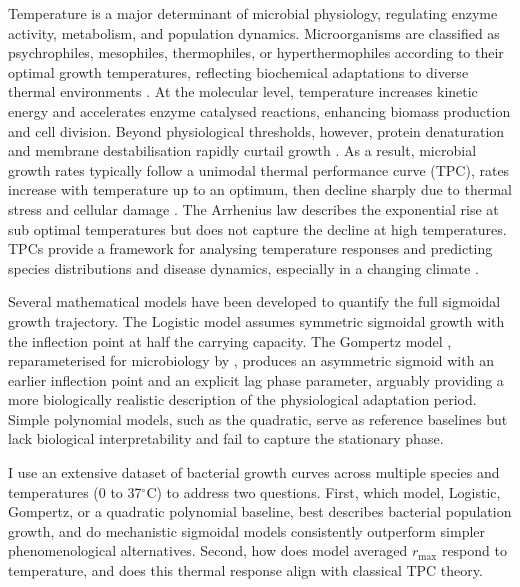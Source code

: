 \documentclass[11pt,a4paper]{article}
\begin{document}
Temperature is a major determinant of microbial physiology, regulating
enzyme activity, metabolism, and population dynamics. Microorganisms are
classified as psychrophiles, mesophiles, thermophiles, or
hyperthermophiles according to their optimal growth temperatures,
reflecting biochemical adaptations to diverse thermal environments
\citep{Arpino2024}. At the molecular level, temperature increases kinetic
energy and accelerates enzyme catalysed reactions, enhancing biomass
production and cell division. Beyond physiological thresholds, however,
protein denaturation and membrane destabilisation rapidly curtail growth
\citep{Gaba2024}. As a result, microbial growth rates typically follow
a unimodal thermal performance curve (TPC), rates increase with
temperature up to an optimum, then decline sharply due to thermal stress
and cellular damage \citep{Pawar2021}. The Arrhenius law describes the
exponential rise at sub optimal temperatures but does not capture the
decline at high temperatures. TPCs provide a framework for analysing
temperature responses and predicting species distributions and disease
dynamics, especially in a changing climate \citep{Smith2024}.

Several mathematical models have been developed to quantify the full
sigmoidal growth trajectory. The Logistic model \citep{Verhulst1838}
assumes symmetric sigmoidal growth with the inflection point at half the
carrying capacity. The Gompertz model \citep{Gompertz1825},
reparameterised for microbiology by \citet{Zwietering1990}, produces an
asymmetric sigmoid with an earlier inflection point and an explicit
lag phase parameter, arguably providing a more biologically realistic
description of the physiological adaptation period. Simple polynomial
models, such as the quadratic, serve as reference baselines but lack
biological interpretability and fail to capture the stationary phase.

I use an extensive dataset of bacterial growth curves across
multiple species and temperatures (0 to 37$^\circ$C) to address two
questions. First, which model, Logistic, Gompertz, or a quadratic
polynomial baseline, best describes bacterial population growth, and do
mechanistic sigmoidal models consistently outperform simpler
phenomenological alternatives. Second, how does model averaged $r_{\max}$
respond to temperature, and does this thermal response align with
classical TPC theory.

\end{document}
